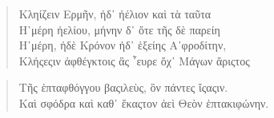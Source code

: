 %
%
%
\begin{quote}
\textgreek{Κληίζειν Ερμῆν, ἠδ᾿ ἠέλιον καὶ τὰ ταῦτα}\\
\textgreek{Η῾μέρη ἠελίου, μήνην δ᾿ ὅτε τῆς δὲ παρείη}\\
\textgreek{Η῾μέρη, ἠδὲ Κρόνον ἠδ᾿ ἑξείης Α᾿φροδίτην},\\
%
\textgreek{Κλήςεςιν ἀφθέγκτοις ἃς ῟ευρε ὄχ᾿ Μάγων ἄριςτος}\\
\end{quote}
{}
\begin{quote}
\textgreek{Τῆς ἑπταφθόγγου βαςιλεὺς, ὃν πάντες ἴςαςιν.}\\
%
\textgreek{Καὶ σφόδρα καὶ καθ᾿ ἕκαςτον ἀεὶ Θεὸν ἑπτακιφώνην.}
\end{quote}
